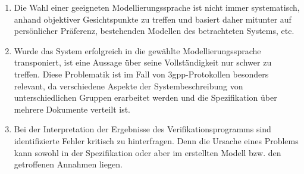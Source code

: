 \begin{enumerate}[label=$\bullet$]
    \item Die Wahl einer geeigneten Modellierungssprache ist nicht immer systematisch, anhand objektiver Gesichtspunkte zu treffen und basiert daher mitunter auf persönlicher Präferenz, bestehenden Modellen des betrachteten Systems, etc. 
    \item Wurde das System erfolgreich in die gewählte Modellierungssprache transponiert, ist eine Aussage über seine Vollständigkeit nur schwer zu treffen. 
    Diese Problematik ist im Fall von \gls{3gpp}-Protokollen besonders relevant, da verschiedene Aspekte der Systembeschreibung von unterschiedlichen Gruppen erarbeitet werden und die Spezifikation über mehrere Dokumente verteilt ist. 
    \item Bei der Interpretation der Ergebnisse des Verifikationsprogramms sind identifizierte Fehler kritisch zu hinterfragen. Denn die Ursache eines Problems kann sowohl in der Spezifikation oder aber im erstellten Modell bzw. den getroffenen Annahmen liegen.
\end{enumerate}